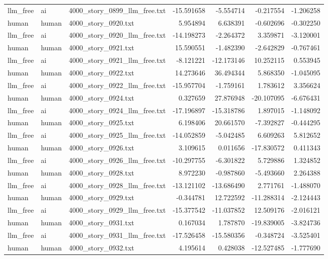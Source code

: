 \begin{longtable}{lllrrrr}
llm\_free & ai & 4000\_story\_0899\_llm\_free.txt & -15.591658 & -5.554714 & -0.217554 & -1.206258 \\
human & human & 4000\_story\_0920.txt & 5.954894 & 6.638391 & -0.602696 & -0.302250 \\
llm\_free & ai & 4000\_story\_0920\_llm\_free.txt & -14.198273 & -2.264372 & 3.359871 & -3.120001 \\
human & human & 4000\_story\_0921.txt & 15.590551 & -1.482390 & -2.642829 & -0.767461 \\
llm\_free & ai & 4000\_story\_0921\_llm\_free.txt & -8.121221 & -12.173146 & 10.252115 & 0.553945 \\
human & human & 4000\_story\_0922.txt & 14.273646 & 36.494344 & 5.868350 & -1.045095 \\
llm\_free & ai & 4000\_story\_0922\_llm\_free.txt & -15.957704 & -1.759161 & 1.783612 & 3.356624 \\
human & human & 4000\_story\_0924.txt & 0.327659 & 27.876948 & -20.107095 & -6.676431 \\
llm\_free & ai & 4000\_story\_0924\_llm\_free.txt & -17.196897 & -15.318786 & 1.897015 & -1.148092 \\
human & human & 4000\_story\_0925.txt & 6.198406 & 20.661570 & -7.392827 & -0.444295 \\
llm\_free & ai & 4000\_story\_0925\_llm\_free.txt & -14.052859 & -5.042485 & 6.609263 & 5.812652 \\
human & human & 4000\_story\_0926.txt & 3.109615 & 0.011656 & -17.830572 & 0.411343 \\
llm\_free & ai & 4000\_story\_0926\_llm\_free.txt & -10.297755 & -6.301822 & 5.729886 & 1.324852 \\
human & human & 4000\_story\_0928.txt & 8.972230 & -0.987860 & -5.493660 & 2.264388 \\
llm\_free & ai & 4000\_story\_0928\_llm\_free.txt & -13.121102 & -13.686490 & 2.771761 & -1.488070 \\
human & human & 4000\_story\_0929.txt & -0.344781 & 12.722592 & -11.288314 & -2.124443 \\
llm\_free & ai & 4000\_story\_0929\_llm\_free.txt & -15.377542 & -11.037852 & 12.509176 & -2.016121 \\
human & human & 4000\_story\_0931.txt & 0.167034 & 1.787870 & -19.839005 & -3.824736 \\
llm\_free & ai & 4000\_story\_0931\_llm\_free.txt & -17.526458 & -15.580356 & -0.348724 & -3.525401 \\
human & human & 4000\_story\_0932.txt & 4.195614 & 0.428038 & -12.527485 & -1.777690 \\

\end{longtable}
